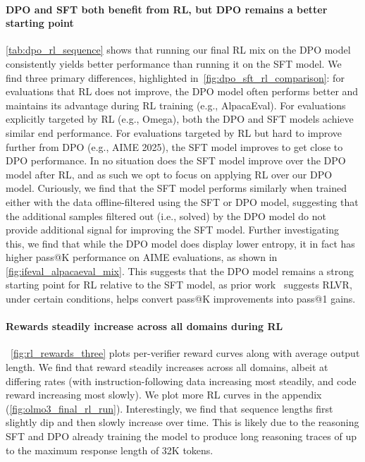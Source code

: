 \documentclass[table]{ai2style/ai2}
\begin{document}
{{\paragraph{DPO and SFT both benefit from RL, but DPO remains a better starting point}
\autoref{tab:dpo_rl_sequence} shows that running our final RL mix on the DPO model consistently yields better performance than running it on the SFT model. We find three primary differences, highlighted in~\autoref{fig:dpo_sft_rl_comparison}: for evaluations that RL does not improve, the DPO model often performs better and maintains its advantage during RL training (e.g., AlpacaEval). For evaluations explicitly targeted by RL (e.g., Omega), both the DPO and SFT models achieve similar end performance. For evaluations targeted by RL but hard to improve further from DPO (e.g., AIME 2025), the SFT model improves to get close to DPO performance. In no situation does the SFT model improve over the DPO model after RL, and as such we opt to focus on applying RL over our DPO model.
Curiously, we find that the SFT model performs similarly when trained either with the data offline-filtered using the SFT or DPO model, suggesting that the additional samples filtered out (i.e., solved) by the DPO model do not provide additional signal for improving the SFT model.
Further investigating this, we find that while the DPO model does display lower entropy, it in fact has higher pass@K performance on AIME evaluations, as shown in \autoref{fig:ifeval_alpacaeval_mix}.
This suggests that the DPO model remains a strong starting point for RL relative to the SFT model, as prior work~\citep{yue2025limit-of-rlvr,shao2024deepseekmath} suggests RLVR, under certain conditions, helps convert pass@K improvements into pass@1 gains.

\paragraph{Rewards steadily increase across all domains during RL} ~\autoref{fig:rl_rewards_three} plots per-verifier reward curves along with average output length. We find that reward steadily increases across all domains, albeit at differing rates (with instruction-following data increasing most steadily, and code reward increasing most slowly).
We plot more RL curves in the appendix (\autoref{fig:olmo3_final_rl_run}).
Interestingly, we find that sequence lengths first slightly dip and then slowly increase over time. This is likely due to the reasoning SFT and DPO already training the model to produce long reasoning traces of up to the maximum response length of 32K tokens.

}}
\end{document}
